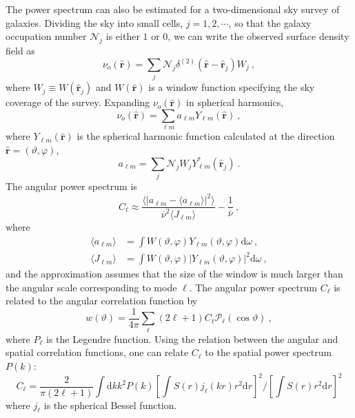 \documentclass[12pt,a4paper]{article}
\renewcommand{\vec}[1]{\boldsymbol{#1}}
\newcommand{\dif}{\mathrm{d}}
\begin{document}
The power spectrum can also be estimated for a two-dimensional sky survey of galaxies. Dividing the sky into small cells, $j = 1, 2, \cdots$, so that the galaxy occupation number $\mathscr N_j$ is either $1$ or $0$, we can write the observed surface density field as
\begin{equation}
\nu_o(\hat{\vec{r}}) = \sum_j \mathscr N_j \delta^{(2)} (\hat{\vec{r}} -\hat{\vec{r}}_j) W_j ~,
\end{equation}
where $W_j \equiv W(\hat{\vec{r}}_j)$ and $W(\hat{\vec{r}})$ is a window function specifying the sky coverage of the survey. Expanding $\nu_o(\hat{\vec{r}})$ in spherical harmonics,
\begin{equation}
\nu_o(\hat{\vec{r}}) = \sum_{\ell m} a_{\ell m} Y_{\ell m}(\hat{\vec{r}}) ~,
\end{equation}
where $Y_{\ell m}(\hat{\vec{r}})$ is the spherical harmonic function calculated at the direction $\hat{\vec{r}} = (\vartheta, \varphi)$, 
\begin{equation}
a_{\ell m} = \sum_j \mathscr N_j W_j Y^\ast_{\ell m}(\hat{\vec{r}}_j) ~.
\end{equation}
The angular power spectrum is
\begin{equation}
C_\ell \approx \dfrac{\langle |a_{\ell m} -\langle a_{\ell m} \rangle|^2\rangle}{\overline{\nu}^2 \langle J_{\ell m} \rangle} - \dfrac{1}{\overline{\nu}} ~,
\end{equation}
where
\begin{align}
\nonumber \langle a_{\ell m} \rangle &= \int W( \vartheta, \varphi) Y_{\ell m}( \vartheta, \varphi) \dif \omega ~, \\
\nonumber \langle J_{\ell m} \rangle &= \int W( \vartheta, \varphi) |Y_{\ell m}( \vartheta, \varphi)|^2 \dif \omega ~,
\end{align}
and the approximation assumes that the size of the window is much larger than the angular scale corresponding to mode $\ell$. The angular power spectrum $C_\ell$ is related to the angular correlation function by
\begin{equation}
w( \vartheta) = \dfrac{1}{4\pi} \sum_{\ell} (2\ell +1) C_\ell \mathscr P_\ell(\cos  \vartheta) ~,
\end{equation}
where $P_\ell$ is the Legendre function. Using the relation between the angular and spatial correlation functions, one can relate $C_\ell$ to the spatial power spectrum $P(k)$:
\begin{equation}
C_\ell = \dfrac{2}{\pi (2\ell +1)} \int \dif k k^2 P(k) \left[\int S(r) j_\ell(kr) r^2 \dif r \right]^2 \Bigg/ \left[\int S(r) r^2 \dif r  \right]^2
\end{equation}
where $j_\ell$ is the spherical Bessel function.
\end{document}
